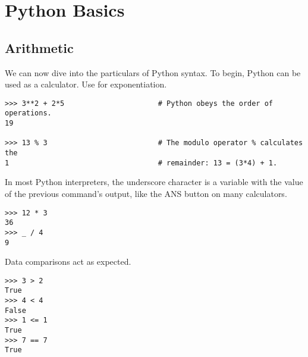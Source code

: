\begin{comment}
The Anaconda distribution also includes three additional interfaces: Notebook, QTConsole, and Spyder.
IPython Notebook (also know as Jupyter) is displayed in a web browser and has many features that are particularly useful for presentations and for running separated blocks of code.
The QTConsole is a console that communicates with Jupyter more fluidly than the regular IPython console.
Spyder is a popular IDE built specifically for Python programming.
To start IPython Notebook, QTConsole, or Spyder from the terminal, run \li{ipython notebook}, \li{ipython qtconsole}, or \li{spyder}, respectively.
Try using each of these interfaces until you find the one you are most comfortable with (we recommend starting with plain \li{ipython} for now).
\end{comment}

\section*{Python Basics} %

\subsection*{Arithmetic} %
We can now dive into the particulars of Python syntax.
To begin, Python can be used as a calculator.
Use \li{**} for exponentiation.

\begin{lstlisting}
>>> 3**2 + 2*5                      # Python obeys the order of operations.
19

>>> 13 % 3                          # The modulo operator % calculates the
1                                   # remainder: 13 = (3*4) + 1. 
\end{lstlisting}
In most Python interpreters, the underscore character \li{\_} is a variable with the value of the previous command's output, like the ANS button on many calculators.

\begin{lstlisting}
>>> 12 * 3
36
>>> _ / 4
9
\end{lstlisting}

Data comparisons act as expected.
\begin{lstlisting}
>>> 3 > 2
True
>>> 4 < 4
False
>>> 1 <= 1
True
>>> 7 == 7
True
\end{lstlisting}

